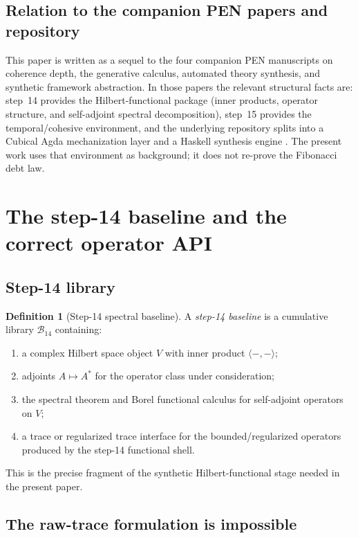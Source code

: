 \documentclass[11pt,a4paper]{article}
\theoremstyle{plain}
\theoremstyle{definition}
\newtheorem{definition}[theorem]{Definition}
\theoremstyle{remark}
\newcommand{\Bcal}{\mathcal{B}}
\begin{document}
\subsection{Relation to the companion PEN papers and repository}

This paper is written as a sequel to the four companion PEN manuscripts on coherence depth, the generative calculus, automated theory synthesis, and synthetic framework abstraction. In those papers the relevant structural facts are: step~14 provides the Hilbert-functional package (inner products, operator structure, and self-adjoint spectral decomposition), step~15 provides the temporal/cohesive environment, and the underlying repository splits into a Cubical Agda mechanization layer and a Haskell synthesis engine \citep{coherencepaper,calcpaper,autopaper,syntheticpaper,penrepo}. The present work uses that environment as background; it does not re-prove the Fibonacci debt law.

\section{The step-14 baseline and the correct operator API}

\subsection{Step-14 library}

\begin{definition}[Step-14 spectral baseline]
A \emph{step-14 baseline} is a cumulative library $\Bcal_{14}$ containing:
\begin{enumerate}[label=(\roman*),leftmargin=2em]
  \item a complex Hilbert space object $V$ with inner product $\langle -, - \rangle$;
  \item adjoints $A \mapsto A^{\ast}$ for the operator class under consideration;
  \item the spectral theorem and Borel functional calculus for self-adjoint operators on $V$;
  \item a trace or regularized trace interface for the bounded/regularized operators produced by the step-14 functional shell.
\end{enumerate}
\end{definition}

This is the precise fragment of the synthetic Hilbert-functional stage needed in the present paper.

\subsection{The raw-trace formulation is impossible}
\end{document}
